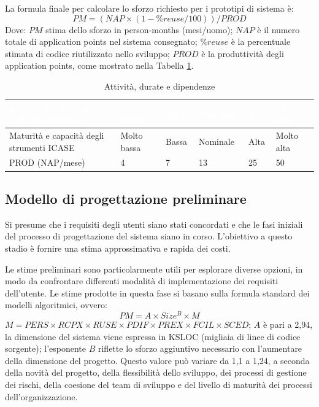 La formula finale per calcolare lo sforzo richiesto per i prototipi di sistema è:
\begin{equation*}
    PM = (NAP\times(1-\%reuse/100))/PROD
\end{equation*}
Dove: $PM$ stima dello sforzo in person-months (mesi/uomo); $NAP$ è il numero totale di application points nel sistema consegnato; $\%reuse$ è la percentuale stimata di codice riutilizzato nello sviluppo; $PROD$ è la produttività degli application points, come mostrato nella Tabella \ref{tab:application-point-productivity}.

\begin{table}[ht]
\centering
{}
\begin{tabular}{|l|l|l|l|l|l|}
\hline
\rowcolor{headerblue}
\textbf{\textcolor{white}{Esperienza e capacità dello sviluppatore}} & \textbf{\textcolor{white}{Molto bassa}} & \textbf{\textcolor{white}{Bassa}} & \textbf{\textcolor{white}{Nominale}} & \textbf{\textcolor{white}{Alta}} & \textbf{\textcolor{white}{Molto alta}} \\\hline
Maturità e capacità degli strumenti ICASE & Molto bassa & Bassa & Nominale & Alta & Molto alta\\\hline
PROD (NAP/mese) & 4 & 7 & 13 & 25 & 50
\\\hline
\end{tabular}
\caption{Attività, durate e dipendenze}
\label{tab:application-point-productivity}
\end{table}

\subsection{Modello di progettazione preliminare}
Si presume che i requisiti degli utenti siano stati concordati e che le fasi iniziali del processo di progettazione del sistema siano in corso. L'obiettivo a questo stadio è fornire una stima approssimativa e rapida dei costi. 

Le stime preliminari sono particolarmente utili per esplorare diverse opzioni, in modo da confrontare differenti modalità di implementazione dei requisiti dell'utente. Le stime prodotte in questa fase si basano sulla formula standard dei modelli algoritmici, ovvero:
\begin{equation*}
    PM=A\times Size^B\times M
\end{equation*}
$M = PERS\times RCPX\times RUSE\times PDIF\times PREX\times FCIL\times SCED$; $A$ è pari a 2,94, la dimensione del sistema viene espressa in KSLOC (migliaia di linee di codice sorgente); l'esponente $B$ riflette lo sforzo aggiuntivo necessario con l'aumentare della dimensione del progetto. Questo valore può variare da 1,1 a 1,24, a seconda della novità del progetto, della flessibilità dello sviluppo, dei processi di gestione dei rischi, della coesione del team di sviluppo e del livello di maturità dei processi dell'organizzazione.

